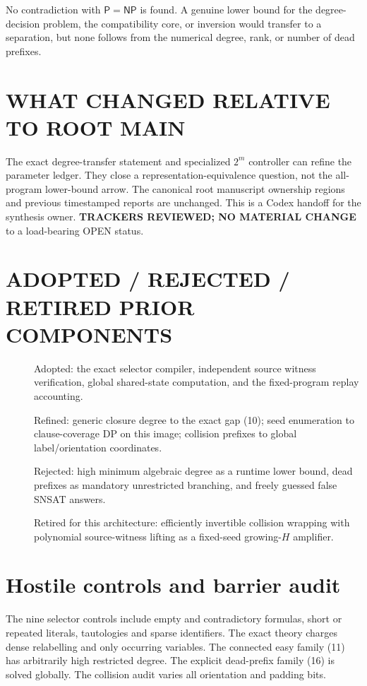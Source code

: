 \documentclass[11pt]{article}
\begin{document}
No contradiction with $\mathsf P=\mathsf{NP}$ is found.
A genuine lower bound for the degree-decision problem, the compatibility
core, or inversion would transfer to a separation, but none follows
from the numerical degree, rank, or number of dead prefixes.

\section*{WHAT CHANGED RELATIVE TO ROOT MAIN}
The exact degree-transfer statement and specialized $2^m$ controller
can refine the parameter ledger. They close a representation-equivalence
question, not the all-program lower-bound arrow.
The canonical root manuscript ownership regions and previous
timestamped reports are unchanged. This is a Codex handoff for the
synthesis owner.
\textbf{TRACKERS REVIEWED; NO MATERIAL CHANGE} to a load-bearing
OPEN status.

\section*{ADOPTED / REJECTED / RETIRED PRIOR COMPONENTS}
\begin{description}
\item[] Adopted: the exact selector compiler, independent source
witness verification, global shared-state computation, and the
fixed-program replay accounting.
\item[] Refined: generic closure degree to the exact gap (10);
seed enumeration to clause-coverage DP on this image;
collision prefixes to global label/orientation coordinates.
\item[] Rejected: high minimum algebraic degree as a runtime lower
bound, dead prefixes as mandatory unrestricted branching,
and freely guessed false SNSAT answers.
\item[] Retired for this architecture: efficiently invertible
collision wrapping with polynomial source-witness lifting as a
fixed-seed growing-$H$ amplifier.
\end{description}

\section*{Hostile controls and barrier audit}
The nine selector controls include empty and contradictory formulas,
short or repeated literals, tautologies and sparse identifiers.
The exact theory charges dense relabelling and only occurring variables.
The connected easy family (11) has arbitrarily high restricted degree.
The explicit dead-prefix family (16) is solved globally.
The collision audit varies all orientation and padding bits.
\end{document}
